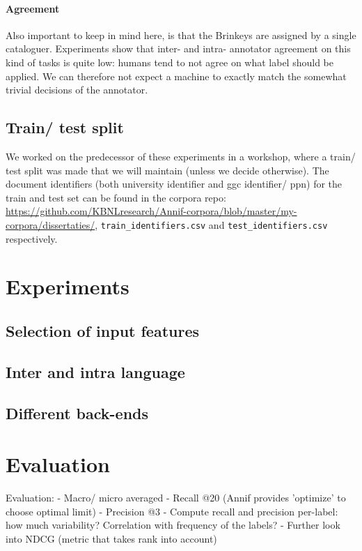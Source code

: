 \documentclass{article}
\begin{document}
\paragraph{Agreement}
Also important to keep in mind here, is that the Brinkeys are assigned by a single cataloguer. Experiments show that inter- and intra- annotator agreement on this kind of tasks is quite low: humans tend to not agree on what label should be applied. We can therefore not expect a machine to exactly match the somewhat trivial decisions of the annotator.  


\subsection{Train/ test split}
We worked on the predecessor of these experiments in a workshop, where a train/ test split was made that we will maintain (unless we decide otherwise). The document identifiers (both university identifier and ggc identifier/ ppn) for the train and test set can be found in the corpora repo: \url{https://github.com/KBNLresearch/Annif-corpora/blob/master/my-corpora/dissertaties/}, \verb|train_identifiers.csv| and \verb|test_identifiers.csv| respectively.

\section{Experiments}

\subsection{Selection of input features}
\subsection{Inter and intra language}
\subsection{Different back-ends}


\section{Evaluation}

Evaluation:
   - Macro/ micro averaged
   - Recall @20 (Annif provides 'optimize' to choose optimal limit)
   - Precision @3
   - Compute recall and precision per-label: how much variability? Correlation with frequency of the labels?
   - Further look into NDCG (metric that takes rank into account)
\end{document}
